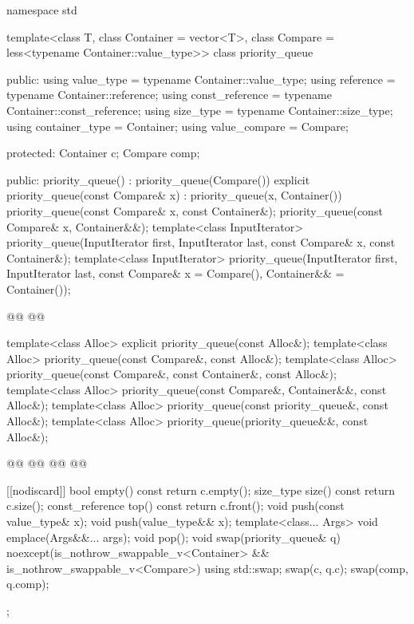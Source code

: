 \documentclass{wg21}
\begin{document}
\begin{codeblock}
namespace std {
template<class T, class Container = vector<T>,
class Compare = less<typename Container::value_type>>
class priority_queue {
    public:
    using value_type      = typename Container::value_type;
    using reference       = typename Container::reference;
    using const_reference = typename Container::const_reference;
    using size_type       = typename Container::size_type;
    using container_type  = Container;
    using value_compare   = Compare;

    protected:
    Container c;
    Compare comp;

    public:
    priority_queue() : priority_queue(Compare()) {}
    explicit priority_queue(const Compare& x) : priority_queue(x, Container()) {}
    priority_queue(const Compare& x, const Container&);
    priority_queue(const Compare& x, Container&&);
    template<class InputIterator>
    priority_queue(InputIterator first, InputIterator last, const Compare& x,
        const Container&);
    template<class InputIterator>
    priority_queue(InputIterator first, InputIterator last,
        const Compare& x = Compare(), Container&& = Container());

    @@
    @@


    template<class Alloc> explicit priority_queue(const Alloc&);
    template<class Alloc> priority_queue(const Compare&, const Alloc&);
    template<class Alloc> priority_queue(const Compare&, const Container&, const Alloc&);
    template<class Alloc> priority_queue(const Compare&, Container&&, const Alloc&);
    template<class Alloc> priority_queue(const priority_queue&, const Alloc&);
    template<class Alloc> priority_queue(priority_queue&&, const Alloc&);

    @@
    @@
    @@
    @@


    [[nodiscard]] bool empty() const { return c.empty(); }
    size_type size()  const          { return c.size(); }
    const_reference   top() const    { return c.front(); }
    void push(const value_type& x);
    void push(value_type&& x);
    template<class... Args> void emplace(Args&&... args);
    void pop();
    void swap(priority_queue& q) noexcept(is_nothrow_swappable_v<Container> &&
    is_nothrow_swappable_v<Compare>)
    { using std::swap; swap(c, q.c); swap(comp, q.comp); }
};

}
\end{codeblock}
\end{document}
